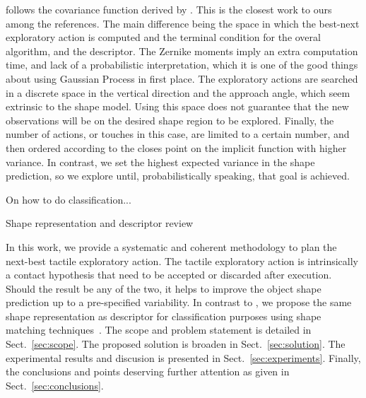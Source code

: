 \documentclass[twocolumn,draft,natbib]{svjour3}
\begin{document}
\citet{Bjorkman2013Enhancing} follows the covariance function derived by \citet{Williams2007Gaussian}. This is the closest work to ours among the references. The main difference being the space in which the best-next exploratory action is computed and the terminal condition for the overal algorithm, and the descriptor. The Zernike moments imply an extra computation time, and lack of a probabilistic interpretation, which it is one of the good things about using Gaussian Process in first place. The exploratory actions are searched in a discrete space in the vertical direction and the approach angle, which seem extrinsic to the shape model. Using this space does not guarantee that the new observations will be on the desired shape region to be explored.  Finally, the number of actions, or touches in this case, are limited to a certain number, and then ordered according to the closes point on the implicit function with higher variance. In contrast, we set the highest expected variance in the shape prediction, so we explore until, probabilistically speaking, that goal is achieved.



On how to do classification...

Shape representation and descriptor review \citet{Zhang2004Review}

In this work, we provide a systematic and coherent methodology to plan the next-best tactile exploratory action. The tactile exploratory action is intrinsically a contact hypothesis that need to be accepted or discarded after execution. Should the result be any of the two, it helps to improve the object shape prediction up to a pre-specified variability. In contrast to \citet{Bjorkman2013Enhancing}, we propose the same shape representation as descriptor for classification purposes using shape matching techniques~\citep{Belongie2002Shape}. The scope and problem statement is detailed in Sect.~\ref{sec:scope}. The proposed solution is broaden in Sect.~\ref{sec:solution}. The experimental results and discusion is presented in Sect.~\ref{sec:experiments}. Finally, the conclusions and points deserving further attention as given in Sect.~\ref{sec:conclusions}. 
\end{document}
